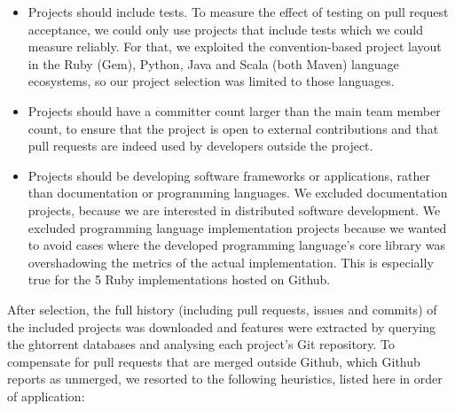 \documentclass{sig-alternate}
\begin{document}
\begin{itemize}

  \item Projects should include tests. To measure the effect of testing on pull
    request acceptance, we could only use projects that include tests which we
    could measure reliably. For that, we exploited the convention-based project
    layout in the Ruby (Gem), Python, Java and Scala (both Maven) language
    ecosystems, so our project selection was limited to those languages. 

  \item Projects should have a committer count larger than the main team member
    count, to ensure that the project is open to external contributions and that
    pull requests are indeed used by developers outside the project.

  \item Projects should be developing software frameworks or applications,
    rather than documentation or programming languages. We excluded
    documentation projects, because we are interested in distributed software
    development. We excluded programming language implementation projects
    because we wanted to avoid cases where the developed programming language's
    core library was overshadowing the metrics of the actual implementation.
    This is especially true for the 5 Ruby implementations hosted on Github.

\end{itemize}

After selection, the full history (including pull requests, issues and commits)
of the included projects was downloaded and features were extracted by querying
the {\sc ght}orrent databases and analysing each project's Git repository. To
compensate for pull requests that are merged outside Github, which Github
reports as unmerged, we resorted to the following heuristics, listed here in
order of application:
\end{document}
